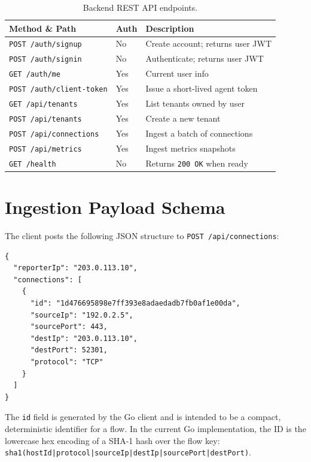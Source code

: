 \documentclass[12pt]{report}
\begin{document}
\begin{table}[H]
\centering
\begin{tabular}{llp{5.5cm}}
\toprule
\textbf{Method \& Path} & \textbf{Auth} & \textbf{Description} \\
\midrule
\texttt{POST /auth/signup}        & No  & Create account; returns user JWT \\
\texttt{POST /auth/signin}        & No  & Authenticate; returns user JWT \\
\texttt{GET  /auth/me}            & Yes & Current user info \\
\texttt{POST /auth/client-token}  & Yes & Issue a short-lived agent token \\
\texttt{GET  /api/tenants}        & Yes & List tenants owned by user \\
\texttt{POST /api/tenants}        & Yes & Create a new tenant \\
\texttt{POST /api/connections}    & Yes & Ingest a batch of connections \\
\texttt{POST /api/metrics}        & Yes & Ingest metrics snapshots \\
\texttt{GET  /health}             & No  & Returns \texttt{200 OK} when ready \\
\bottomrule
\end{tabular}
\caption{Backend REST API endpoints.}
\label{tab:api}
\end{table}


\newpage
\section{Ingestion Payload Schema}

The client posts the following JSON structure to \texttt{POST /api/connections}:

\begin{lstlisting}[language={}, caption={Connection ingestion payload.}, label=lst:payload]
{
  "reporterIp": "203.0.113.10",
  "connections": [
    {
      "id": "1d476695898e7ff393e8adaedadb7fb0af1e00da",
      "sourceIp": "192.0.2.5",
      "sourcePort": 443,
      "destIp": "203.0.113.10",
      "destPort": 52301,
      "protocol": "TCP"
    }
  ]
}
\end{lstlisting}

The \texttt{id} field is generated by the Go client and is intended to be a compact,
deterministic identifier for a flow. In the current Go implementation, the ID is the
lowercase hex encoding of a SHA-1 hash over the flow key:
\texttt{sha1(hostId|protocol|sourceIp|destIp|sourcePort|destPort)}.
\end{document}
